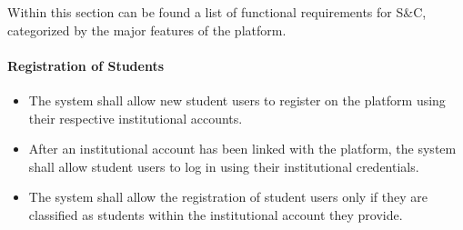 




Within this section can be found a list of functional requirements for S\&C, categorized by the major features of the platform.

\paragraph{Registration of Students}
\begin{itemize}[label={[\textbf{FR}]}, align=left, leftmargin=*]
    \item {} The system shall allow new student users to register on the platform using their respective institutional accounts.
    \item {} After an institutional account has been linked with the platform, the system shall allow student users to log in using their institutional credentials.
    \item {} The system shall allow the registration of student users only if they are classified as students within the institutional account they provide.
\end{itemize}

